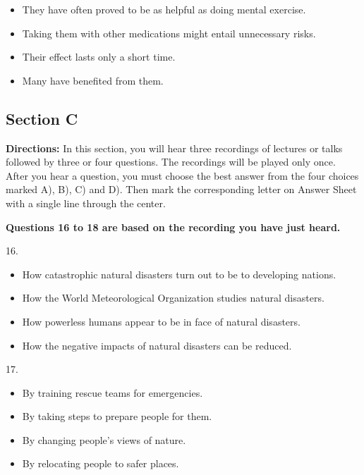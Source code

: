 \documentclass[UTF8,11pt]{ctexart}
\begin{document}
\begin{itemize}[leftmargin=2em,itemsep=.2em,topsep=.4em]\item[A.] They have often proved to be as helpful as doing mental exercise.
\item[B.] Taking them with other medications might entail unnecessary risks.
\item[C.] Their effect lasts only a short time.
\item[D.] Many have benefited from them.
\end{itemize}

\subsection*{\textbf{Section C}}


\textbf{Directions:} In this section, you will hear three recordings of lectures or talks followed by three or four questions. The recordings will be played only once. After you hear a question, you must choose the best answer from the four choices marked A), B), C) and D). Then mark the corresponding letter on Answer Sheet with a single line through the center.


\textbf{Questions 16 to 18 are based on the recording you have just heard.}


16.


\begin{itemize}[leftmargin=2em,itemsep=.2em,topsep=.4em]\item[A.] How catastrophic natural disasters turn out to be to developing nations.
\item[B.] How the World Meteorological Organization studies natural disasters.
\item[C.] How powerless humans appear to be in face of natural disasters.
\item[D.] How the negative impacts of natural disasters can be reduced.
\end{itemize}

17.


\begin{itemize}[leftmargin=2em,itemsep=.2em,topsep=.4em]\item[A.] By training rescue teams for emergencies.
\item[B.] By taking steps to prepare people for them.
\item[C.] By changing people’s views of nature.
\item[D.] By relocating people to safer places.
\end{itemize}
\end{document}
